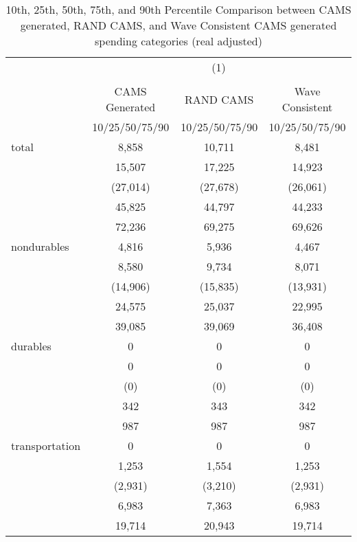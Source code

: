 \begin{table}[htbp]\centering
\def\sym#1{\ifmmode^{#1}\else\(^{#1}\)\fi}
\caption{10th, 25th, 50th, 75th, and 90th Percentile Comparison between CAMS generated, RAND CAMS, and Wave Consistent CAMS generated spending categories (real adjusted)}
\begin{tabular}{l*{3}{c}}
\hline\hline
            &\multicolumn{3}{c}{(1)}               \\
            &\multicolumn{3}{c}{}                  \\
            &CAMS Generated&   RAND CAMS&Wave Consistent\\
            &10/25/50/75/90&10/25/50/75/90&10/25/50/75/90\\
\hline
total       &       8,858&      10,711&       8,481\\
            &      15,507&      17,225&      14,923\\
            &    (27,014)&    (27,678)&    (26,061)\\
            &      45,825&      44,797&      44,233\\
            &      72,236&      69,275&      69,626\\
[1em]
nondurables &       4,816&       5,936&       4,467\\
            &       8,580&       9,734&       8,071\\
            &    (14,906)&    (15,835)&    (13,931)\\
            &      24,575&      25,037&      22,995\\
            &      39,085&      39,069&      36,408\\
[1em]
durables    &           0&           0&           0\\
            &           0&           0&           0\\
            &         (0)&         (0)&         (0)\\
            &         342&         343&         342\\
            &         987&         987&         987\\
[1em]
transportation&           0&           0&           0\\
            &       1,253&       1,554&       1,253\\
            &     (2,931)&     (3,210)&     (2,931)\\
            &       6,983&       7,363&       6,983\\
            &      19,714&      20,943&      19,714\\

\end{tabular}
\end{table}
